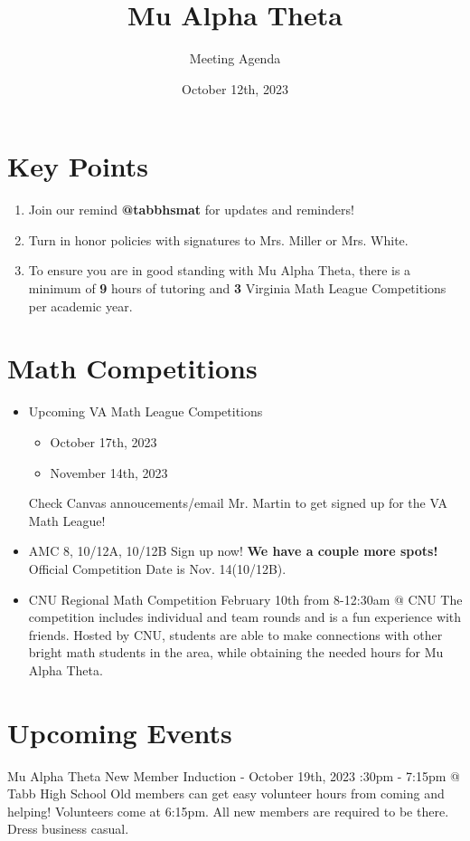\documentclass[11pt]{article}
\author{Meeting Agenda}
\title{Mu Alpha Theta}
\date{October 12th, 2023}
\begin{document}
  \maketitle

  \section{Key Points}
    \begin{enumerate}
        \item Join our remind \textbf{@tabbhsmat} for updates and reminders!
        \item Turn in honor policies with signatures to Mrs. Miller or Mrs. White.
        \item To ensure you are in good standing with Mu Alpha Theta, there is a minimum of \textbf{9} hours of tutoring and \textbf{3} Virginia Math League Competitions per academic year.
    \end{enumerate}
  \section{Math Competitions} 
    \begin{itemize}
        \item Upcoming VA Math League Competitions
            \begin{itemize}
                \item October 17th, 2023
                \item November 14th, 2023
            \end{itemize}
            Check Canvas annoucements/email Mr. Martin to get signed up for the VA Math League! 
        \item AMC 8, 10/12A, 10/12B \newline
        Sign up now! \textbf{We have a couple more spots!} \newline
        Official Competition Date is Nov. 14(10/12B).
        \item CNU Regional Math Competition \newline
        February 10th from 8-12:30am @ CNU \newline
        The competition includes individual and team rounds and is a fun experience with friends. Hosted by CNU, students are able to make connections with other bright math students in the area, while obtaining the needed hours for Mu Alpha Theta. 
        
    \end{itemize}
    \section{Upcoming Events}
    \begin{description}
        Mu Alpha Theta New Member Induction - October 19th, 2023 :30pm - 7:15pm @ Tabb High School \newline
        Old members can get easy volunteer hours from coming and helping! Volunteers come at 6:15pm. All new members are required to be there. Dress business casual. 
    \end{description}
\end{document}
